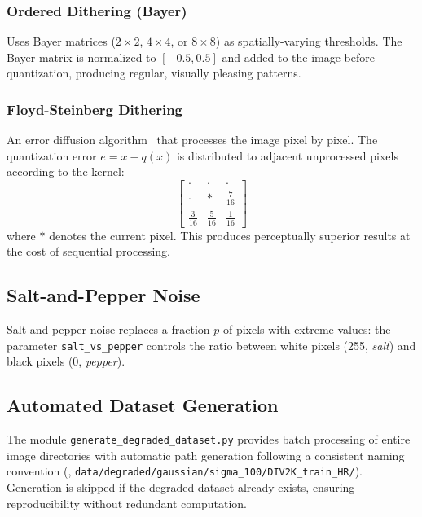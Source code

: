 \subsubsection{Ordered Dithering (Bayer)}
Uses Bayer matrices ($2\!\times\!2$, $4\!\times\!4$, or $8\!\times\!8$) as spatially-varying thresholds. The Bayer matrix is normalized to $[-0.5, 0.5]$ and added to the image before quantization, producing regular, visually pleasing patterns.

\subsubsection{Floyd-Steinberg Dithering}
An error diffusion algorithm~\cite{floyd} that processes the image pixel by pixel. The quantization error $e = x - q(x)$ is distributed to adjacent unprocessed pixels according to the kernel:
\begin{equation}
\begin{bmatrix}
\cdot & \cdot & \cdot \\
\cdot & \ast & \frac{7}{16} \\[3pt]
\frac{3}{16} & \frac{5}{16} & \frac{1}{16}
\end{bmatrix}
\end{equation}
where $\ast$ denotes the current pixel. This produces perceptually superior results at the cost of sequential processing.

\subsection{Salt-and-Pepper Noise}

Salt-and-pepper noise replaces a fraction $p$ of pixels with extreme values: the parameter \texttt{salt\_vs\_pepper} controls the ratio between white pixels (255, \textit{salt}) and black pixels (0, \textit{pepper}).

\subsection{Automated Dataset Generation}

The module \texttt{generate\_degraded\_dataset.py} provides batch processing of entire image directories with automatic path generation following a consistent naming convention (\eg, \texttt{data/\allowbreak{}degraded/\allowbreak{}gaussian/\allowbreak{}sigma\_100/\allowbreak{}DIV2K\_train\_HR/}). Generation is skipped if the degraded dataset already exists, ensuring reproducibility without redundant computation.
